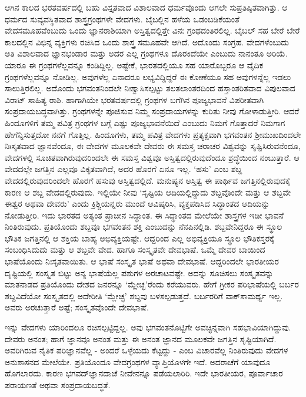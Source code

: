 ಆಗಿನ ಕಾಲದ ಭರತವರ್ಷದಲ್ಲಿ ಬಹು ವಿಸ್ತೃತವಾದ ವಿಶಾಲವಾದ ಧರ್ಮವೊಂದು ಆಗಲೇ ಸುಪ್ರತಿಷ್ಠಿತವಾಗಿತ್ತು. ಆ ಧರ್ಮದ ಸುವ್ಯವಸ್ಥಿತವಾದ ಶಾಸ್ತ್ರಗ್ರಂಥಗಳೇ ವೇದಗಳು. ಬೈಬಲ್ಲಿನ ಹಳೆಯ ಒಡಂಬಡಿಕೆಯಂತೆ ವೇದಸಮೂಹವೆಂಬುದು ಒಂದು ಜ್ಞಾನರಾಶಿಯಾಗಿ ಅಸ್ತಿತ್ವದಲ್ಲಿತ್ತೇ ವಿನಃ ಗ್ರಂಥದಂತಿರಲಿಲ್ಲ. ಬೈಬಲ್ ಸಹ ಬೇರೆ ಬೇರೆ ಕಾಲದಲ್ಲಿನ ವಿಭಿನ್ನ ವ್ಯಕ್ತಿಗಳು ರಚಿಸಿದ ಒಂದು ಶಾಸ್ತ್ರ ಸಮೂಹವೇ ಆಗಿದೆ. ಅದೊಂದು ಸಂಗ್ರಹ. ವೇದಗಳೆಂಬುದು ಅತಿ ವಿಶಾಲವಾದ ಜ್ಞಾನಭಂಡಾರ ಮತ್ತು ಅದರ ಎಲ್ಲ ಗ್ರಂಥಗಳೂ ದೊರಕಿದೆಯೇ ಎಂಬುದು ನಾನಂತೂ ಅರಿಯೆ. ಯಾರೂ ಈ ಗ್ರಂಥಗಳೆಲ್ಲವನ್ನೂ ಕಂಡಿದ್ದಿಲ್ಲ. ಅಷ್ಟೇಕೆ, ಭಾರತದಲ್ಲಿಯೂ ಸಹ ಯಾರೊಬ್ಬರೂ ಆ ವೈದಿಕ ಗ್ರಂಥಗಳೆಲ್ಲವನ್ನೂ ನೋಡಿಲ್ಲ. ಅವುಗಳೆಲ್ಲ ಏನಾದರೂ ಲಭ್ಯವಿದ್ದಿದ್ದರೆ ಈ ಕೋಣೆಯೂ ಸಹ ಅವುಗಳನ್ನೆಲ್ಲ ಇಡಲು ಸಾಲುತ್ತಿರಲಿಲ್ಲ. ಅದೊಂದು ಭಗವಂತನಿಂದಲೇ ನಿಃಶ್ವಾಸಿಸಲ್ಪಟ್ಟು ತಲತಲಾಂತರದಿಂದ ಹಸ್ತಾಂತರಿತವಾದ ವಿಪುಲವಾದ ವಿರಾಟ್ ಸಾಹಿತ್ಯ ರಾಶಿ. ಹಾಗಾಗಿಯೇ ಭರತವರ್ಷದಲ್ಲಿ ಗ್ರಂಥಗಳ ಬಗೆಗಿನ ಪೂಜ್ಯಭಾವನೆ ವಿಪರೀತವಾಗಿ ಸಂಪ್ರದಾಯಬದ್ಧವಾಗಿತ್ತು. ಗ್ರಂಥಗಳನ್ನೇ ಪೂಜಿಸುವ ನಿಮ್ಮ ಸಂಪ್ರದಾಯಗಳನ್ನು ಕುರಿತು ನೀವು ಗೋಳಾಡುತ್ತೀರಿ. ಆದರೆ ಹಿಂದೂಗಳಿಗೆ ತಮ್ಮ ಪವಿತ್ರ ಗ್ರಂಥಗಳ ಬಗ್ಗೆ ಎಷ್ಟು ಪೂಜ್ಯಭಾವನೆಯಿದೆ ಎಂಬುದು ನಿಮಗೆ ಗೊತ್ತಾದರೆ ನಿಮಗಾಗ ಹೇಗೆನ್ನಿಸುತ್ತದೋ ನನಗೆ ಗೊತ್ತಿಲ್ಲ. ಹಿಂದೂಗಳು, ತಮ್ಮ ಪವಿತ್ರ ವೇದಗಳು ಪ್ರತ್ಯಕ್ಷವಾಗಿ ಭಗವಂತನ ಶ‍್ರೀಮುಖದಿಂದಲೇ ನಿಃಸೃತವಾದ ಜ್ಞಾನವೆಂದೂ, ಈ ವೇದಗಳ ಮೂಲಕವೇ ದೇವರು ಈ ಸಮಸ್ತ ಚರಾಚರ ವಿಶ್ವವನ್ನು ಸೃಷ್ಟಿಸಿರುವನೆಂದೂ, ವೇದಗಳಲ್ಲಿ ಸೂಚಿತವಾಗಿರುವುದರಿಂದಲೇ ಈ ಸಮಸ್ತ ವಿಶ್ವವೂ ಅಸ್ತಿತ್ವದಲ್ಲಿರುವುದೆಂದೂ ಶ್ರದ್ಧೆಯಿಂದ ನಂಬುತ್ತಾರೆ. ಆ ವೇದದಲ್ಲೇ ಜಗತ್ತಿನ ಎಲ್ಲವೂ ವಿಕೃತವಾಗಿದೆ, ಅದರ ಹೊರಗೆ ಏನೂ ಇಲ್ಲ. ‘ಹಸು’ ಎಂಬ ಶಬ್ದ ವೇದದಲ್ಲಿರುವುದರಿಂದಲೇ ಹೊರಗೆ ಹಸುವು ಅಸ್ತಿತ್ವದಲ್ಲಿದೆ. ಮನುಷ್ಯನ ಅಸ್ತಿತ್ವ ಈ ಪಾರ್ಥಿವ ಜಗತ್ತಿನಲ್ಲಿರುವುದಕ್ಕೆ ಕಾರಣ ಆ ಶಬ್ದ ವೇದದಲ್ಲಿರುವುದು. ಇಲ್ಲಿಯೇ ನೀವು ‘ಸೃಷ್ಟಿಯ ಆದಿಯಲ್ಲಿದ್ದುದು ಶಬ್ದವೊಂದೇ ಮತ್ತು ಆ ಶಬ್ದವೇ ಈಶ್ವರ ಅಥವಾ ದೇವರು’ ಎಂದು ಕ್ರಿಶ್ಚಿಯನ್ನರು ಮುಂದೆ ಆವಿಷ್ಕರಿಸಿ, ವ್ಯಕ್ತಪಡಿಸಿದ ಸಿದ್ಧಾಂತದ ಆದಿಯನ್ನು ನೋಡುತ್ತೀರಿ. ಇದು ಭಾರತದ ಅತ್ಯಂತ ಪ್ರಾಚೀನ ಸಿದ್ಧಾಂತ. ಈ ಸಿದ್ಧಾಂತದ ಮೇಲೆಯೇ ಶಾಸ್ತ್ರಗಳ ಇಡೀ ಭಾವನೆ ನಿಂತಿರುವುದು. ಪ್ರತಿಯೊಂದು ಶಬ್ದವೂ ಭಗವಂತನ ಶಕ್ತಿ ಎಂಬುದನ್ನು ನೆನಪಿನಲ್ಲಿಡಿ. ಶಬ್ದವೇನಿದ್ದರೂ ಈ ಸ್ಥೂಲ ಭೌತಿಕ ಜಗತ್ತಿನಲ್ಲಿ ಆ ಶಕ್ತಿಯ ಬಾಹ್ಯ ಅಭಿವ್ಯಕ್ತಿಯಷ್ಟೇ. ಆದ್ದರಿಂದ ಎಲ್ಲ ಅಭಿವ್ಯಕ್ತಿಯೂ ಸ್ಥೂಲ ಭೌತಿಕಸ್ತರಕ್ಕೆ ಸಂಬಂಧಿಸಿದುದು ಮತ್ತು ಆ ಶಬ್ದವೇ ವೇದ. ಹಾಗೂ ಸಂಸ್ಕೃತವೇ ದೇವಭಾಷೆ. ಒಮ್ಮೆ ದೇವರ ಬಾಯಿಂದ ಭಾಷೆಯೊಂದು ನಿಃಸೃತವಾಯಿತು. ಆ ಭಾಷೆ ಸಂಸ್ಕೃತ ಭಾಷೆ ಅಥವಾ ದೇವಭಾಷೆ. ಆದ್ದರಿಂದಲೇ ಭಾರತೀಯರ ದೃಷ್ಟಿಯಲ್ಲಿ ಸಂಸ್ಕೃತ ಬಿಟ್ಟು ಅನ್ಯ ಭಾಷೆಯೆಲ್ಲ ಪಶುಗಳ ಅರಚಾಟವಷ್ಟೇ. ಅದನ್ನು ಸೂಚಿಸಲು ಸಂಸ್ಕೃತವನ್ನು ಮಾತನಾಡದ ಪ್ರತಿಯೊಂದು ದೇಶದ ಜನರನ್ನೂ ‘ಮ್ಲೇಚ್ಛ’ರೆಂದು ಕರೆಯುವರು. ಹೇಗೆ ಗ್ರೀಕರ ಪರಿಭಾಷೆಯಲ್ಲಿ ಬರ್ಬರ ಶಬ್ದವಿದೆಯೋ ಸಂಸ್ಕೃತದಲ್ಲಿ ಅದೇರೀತಿ ‘ಮ್ಲೇಚ್ಛ’ ಶಬ್ದವು ಬಳಸಲ್ಪಡುತ್ತದೆ. ಬರ್ಬರರಿಗೆ ವಾಕ್‌ಸಾಮರ್ಥ್ಯ ಇಲ್ಲ. ಅವರು ಅರಚುತ್ತಾರೆ ಅಷ್ಟೆ; ಸಂಸ್ಕೃತವೊಂದೇ ದೇವಭಾಷೆ.

ಇನ್ನು ವೇದಗಳು ಯಾರಿಂದಲೂ ರಚಿಸಲ್ಪಟ್ಟಿದ್ದಲ್ಲ. ಅವು ಭಗವಂತನೊಟ್ಟಿಗೇ ಅವಚ್ಛಿನ್ನವಾಗಿ ಸಹಭಾವಿಯಾಗಿದ್ದುವು. ದೇವರು ಅನಂತ; ಹಾಗೆ ಜ್ಞಾನವೂ ಅನಂತ ಮತ್ತು ಈ ಅನಂತ ಜ್ಞಾನದ ಮೂಲಕವೇ ಜಗತ್ತಿನ ಸೃಷ್ಟಿಯಾಗಿದೆ. ಅವರಿಗಿರುವ ನೈತಿಕ ಪರಿಜ್ಞಾನವೆಲ್ಲ - ಅಂದರೆ ಒಳ್ಳೆಯದು ಕೆಟ್ಟದ್ದು - ಎಂಬ ವಿಚಾರವೆಲ್ಲ ನಿಂತಿರುವುದು ವೇದಗಳ ಅನುಶಾಸನದ ಮೇಲೆಯೇ. ಪ್ರತಿಯೊಂದೂ ವೇದಗ್ರಂಥಗಳ ವ್ಯಾಪ್ತಿಯೊಳಗೇ ಇದೆ. ಅದರಾಚೆಗೆ ಯಾವುದೂ ಹೊಗಲಾರದು. ಕಾರಣ ಭಗವದ್‌ಜ್ಞಾನದಾಚೆ ನೀವೇನನ್ನೂ ಪಡೆಯಲಾರಿರಿ. ಇದೇ ಭಾರತೀಯರ, ಪೂರ್ವಾಚಾರ ಪರಾಯಣತೆ ಅಥವಾ ಸಂಪ್ರದಾಯಬದ್ಧತೆ.

